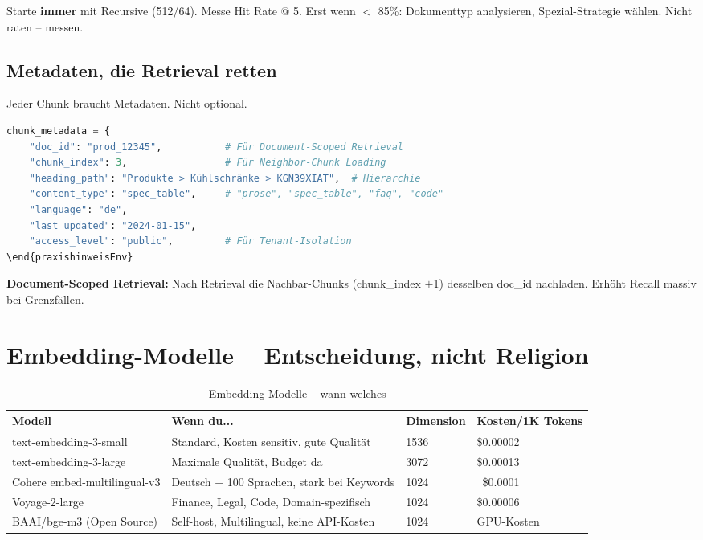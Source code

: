 \par\mbox{}\par
\begin{praxishinweisEnv}
Starte \textbf{immer} mit Recursive (512/64). Messe Hit Rate @ 5. Erst wenn $<$ 85\%: Dokumenttyp analysieren, Spezial-Strategie wählen. Nicht raten -- messen.
\end{praxishinweisEnv}

\subsection{Metadaten, die Retrieval retten}

Jeder Chunk braucht Metadaten. Nicht optional.

\begin{lstlisting}[language=Python, caption={Chunk-Metadaten, die in Produktion zählen}]
chunk_metadata = {
    "doc_id": "prod_12345",           # Für Document-Scoped Retrieval
    "chunk_index": 3,                 # Für Neighbor-Chunk Loading
    "heading_path": "Produkte > Kühlschränke > KGN39XIAT",  # Hierarchie
    "content_type": "spec_table",     # "prose", "spec_table", "faq", "code"
    "language": "de",
    "last_updated": "2024-01-15",
    "access_level": "public",         # Für Tenant-Isolation
\end{praxishinweisEnv}
\end{lstlisting}

\textbf{Document-Scoped Retrieval:} Nach Retrieval die Nachbar-Chunks (chunk\_index $\pm$1) desselben doc\_id nachladen. Erhöht Recall massiv bei Grenzfällen.

\section{Embedding-Modelle -- Entscheidung, nicht Religion}

\begin{table}[H]
\centering
\begin{tabularx}{\linewidth}{lXXX}
\toprule
\textbf{Modell} & \textbf{Wenn du...} & \textbf{Dimension} & \textbf{Kosten/1K Tokens} \\
\midrule
text-embedding-3-small & Standard, Kosten sensitiv, gute Qualität & 1536 & \$0.00002 \\
text-embedding-3-large & Maximale Qualität, Budget da & 3072 & \$0.00013 \\
Cohere embed-multilingual-v3 & Deutsch + 100 Sprachen, stark bei Keywords & 1024 & ~\$0.0001 \\
Voyage-2-large & Finance, Legal, Code, Domain-spezifisch & 1024 & \$0.00006 \\
BAAI/bge-m3 (Open Source) & Self-host, Multilingual, keine API-Kosten & 1024 & GPU-Kosten \\
\midrule
\end{tabularx}
\caption{Embedding-Modelle -- wann welches}
\label{tab:embeddings}
\end{table}

